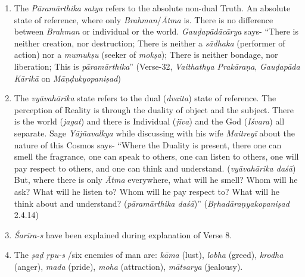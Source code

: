 \begin{enumerate}
\itemsep=0pt
\item
  The \emph{Pāramārthika satya} refers to the absolute non-dual Truth. An absolute state of reference, where only \emph{Brahman}/\emph{Ātma} is. There is no difference between \emph{Brahman} or individual or the world. \emph{Gauḍapādācārya} says- ``There is neither creation, nor destruction; There is neither a \emph{sādhaka} (performer of action) nor a \emph{mumukṣu} (seeker of \emph{mokṣa}); There is neither bondage, nor liberation; This is \emph{pāramārthika}'' (Verse-32, \emph{Vaithathya Prakāraṇa}, \emph{Gauḍapāda Kārikā} on \emph{Māṇḍukyopaniṣad})
\item
  The \emph{vyāvahārika} state refers to the dual (\emph{dvaita}) state of reference. The perception of Reality is through the duality of object and the subject. There is the world (\emph{jagat}) and there is Individual (\emph{jīva}) and the God (\emph{Iśvara}) all separate. Sage \emph{Yājñavalkya} while discussing with his wife \emph{Maitreyī} about the nature of this Cosmos says- ``Where the Duality is present, there one can smell the fragrance, one can speak to others, one can listen to others, one will pay respect to others, and one can think and understand. (\emph{vyāvahārika daśā}) But, where there is only \emph{Ātma} everywhere, what will he smell? Whom will he ask? What will he listen to? Whom will he pay respect to? What will he think about and understand? (\emph{pāramārthika daśā})'' (\emph{Bṛhadāraṇyakopaniṣad} 2.4.14)
\item
  \emph{Śarīra-s} have been explained during explanation of Verse 8.
\item
  The \emph{ṣaḍ ṛpu-s} /six enemies of man are: \emph{kāma} (lust), \emph{lobha} (greed), \emph{krodha} (anger), \emph{mada} (pride), \emph{moha} (attraction), \emph{mātsarya} (jealousy).
\end{enumerate}
